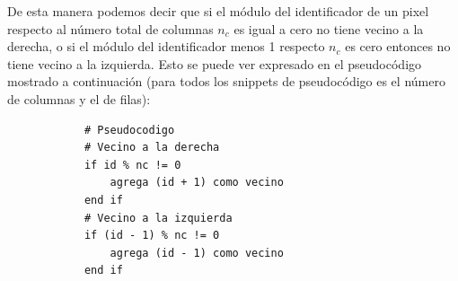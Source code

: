 \begin{enumerate}
\begin{solution}
        De esta manera podemos decir que si el módulo del identificador de un pixel respecto al número total de columnas $n_c$ es igual a cero no tiene vecino a la derecha, o si el módulo del identificador menos 1 respecto $n_c$ es cero entonces no tiene vecino a la izquierda. Esto se puede ver expresado en el pseudocódigo mostrado a continuación (para todos los snippets de pseudocódigo  es el número de columnas y  el de filas):
        \begin{verbatim}
            # Pseudocodigo
            # Vecino a la derecha
            if id % nc != 0
                agrega (id + 1) como vecino
            end if
            # Vecino a la izquierda
            if (id - 1) % nc != 0
                agrega (id - 1) como vecino
            end if
        \end{verbatim}


\end{solution}
\end{enumerate}
